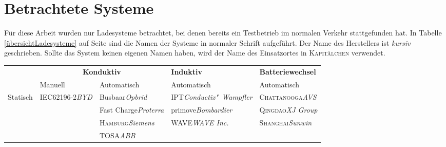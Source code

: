 \documentclass{scrreprt}
\begin{document}
\section{Betrachtete Systeme}
Für diese Arbeit wurden nur Ladesysteme betrachtet, bei denen bereits ein Testbetrieb im normalen Verkehr stattgefunden hat. In Tabelle \ref{übersichtLadesysteme} auf Seite \pageref{übersichtLadesysteme} sind die Namen der Systeme in normaler Schrift aufgeführt. Der Name des Herstellers ist \emph{kursiv} geschrieben. Sollte das System keinen eigenen Namen haben, wird der Name des Einsatzortes in \textsc{Kapitälchen} verwendet.
\begin{table}[htbp]\centering
	\begin{tabularx}{\linewidth}{lp{2.1cm}p{2.1cm}XX}
		\toprule
		                           &                       \multicolumn{2}{c}{\textbf{Konduktiv}}                       & \textbf{Induktiv}                     & \textbf{Batteriewechsel}                \\
		\cmidrule{2-3}             & Manuell                                   & Automatisch                            & Automatisch                           & Automatisch                             \\ \midrule
		\multirow{12}{*}{Statisch} & IEC62196-2\newline\emph{BYD}              & Busbaar\newline\emph{Opbrid}           & IPT\newline\emph{Conductix"~Wampfler} & \textsc{Chattanooga}\newline\emph{AVS}  \\
		                           &                                           & Fast Charge\newline\emph{Proterra}     & primove\newline\emph{Bombardier}      & \textsc{Qingdao}\newline\emph{XJ Group} \\
		                           &                                           & \textsc{Hamburg}\newline\emph{Siemens} & WAVE\newline\emph{WAVE Inc.}          & \textsc{Shanghai}\newline\emph{Sunwin}  \\
		                           &                                           & TOSA\newline\emph{ABB}                 &                                       &  \\

\end{tabularx}
\end{table}
\end{document}
